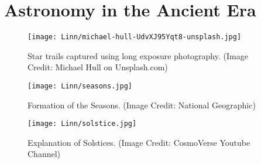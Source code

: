 \documentclass{../template/texnote}
\begin{document}
\section{Astronomy in the Ancient Era}
\begin{figure}
    \centering
    \texttt{[image: Linn/michael-hull-UdvXJ95Yqt8-unsplash.jpg]}
    \caption{Star trails captured using long exposure photography. (Image Credit: Michael Hull on Unsplash.com)}
    \label{fig:my_label}
\end{figure}



\begin{figure}[htbp]
  \centering
  \begin{minipage}[b]{\textwidth}
    \centering
    \texttt{[image: Linn/seasons.jpg]}
    \caption{Formation of the Seasons. (Image Credit: National Geographic)}
    \label{fig:seasons}
  \end{minipage}
  \vspace{0.5cm}

  
  \begin{minipage}[b]{\textwidth}
    \centering
    \texttt{[image: Linn/solstice.jpg]}
      \caption{ Explanation of Solstices. (Image Credit: CosmoVerse Youtube Channel) }
  \label{fig:solstice}
  \end{minipage}
\end{figure}
\end{document}

